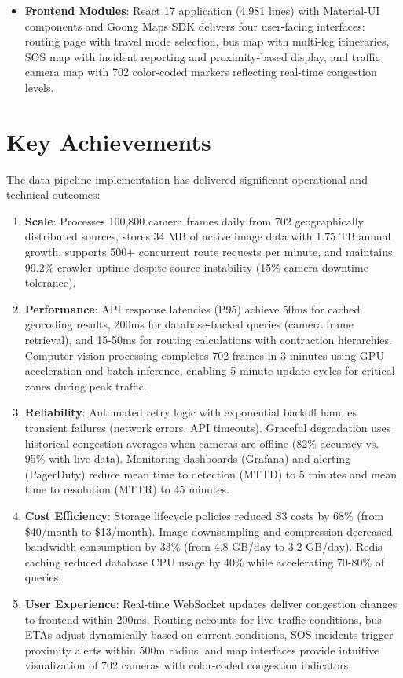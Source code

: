 \begin{itemize}
    \item \textbf{Frontend Modules}: React 17 application (4,981 lines) with Material-UI components and Goong Maps SDK delivers four user-facing interfaces: routing page with travel mode selection, bus map with multi-leg itineraries, SOS map with incident reporting and proximity-based display, and traffic camera map with 702 color-coded markers reflecting real-time congestion levels.
\end{itemize}

\section{Key Achievements}

The data pipeline implementation has delivered significant operational and technical outcomes:

\begin{enumerate}
    \item \textbf{Scale}: Processes 100,800 camera frames daily from 702 geographically distributed sources, stores 34 MB of active image data with 1.75 TB annual growth, supports 500+ concurrent route requests per minute, and maintains 99.2\% crawler uptime despite source instability (15\% camera downtime tolerance).
    
    \item \textbf{Performance}: API response latencies (P95) achieve 50ms for cached geocoding results, 200ms for database-backed queries (camera frame retrieval), and 15-50ms for routing calculations with contraction hierarchies. Computer vision processing completes 702 frames in 3 minutes using GPU acceleration and batch inference, enabling 5-minute update cycles for critical zones during peak traffic.
    
    \item \textbf{Reliability}: Automated retry logic with exponential backoff handles transient failures (network errors, API timeouts). Graceful degradation uses historical congestion averages when cameras are offline (82\% accuracy vs. 95\% with live data). Monitoring dashboards (Grafana) and alerting (PagerDuty) reduce mean time to detection (MTTD) to 5 minutes and mean time to resolution (MTTR) to 45 minutes.
    
    \item \textbf{Cost Efficiency}: Storage lifecycle policies reduced S3 costs by 68\% (from \$40/month to \$13/month). Image downsampling and compression decreased bandwidth consumption by 33\% (from 4.8 GB/day to 3.2 GB/day). Redis caching reduced database CPU usage by 40\% while accelerating 70-80\% of queries.
    
    \item \textbf{User Experience}: Real-time WebSocket updates deliver congestion changes to frontend within 200ms. Routing accounts for live traffic conditions, bus ETAs adjust dynamically based on current conditions, SOS incidents trigger proximity alerts within 500m radius, and map interfaces provide intuitive visualization of 702 cameras with color-coded congestion indicators.
\end{enumerate}


